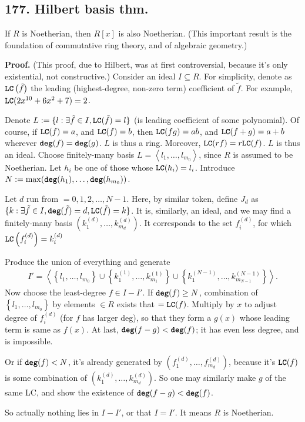 \documentclass[12pt]{article}
\newcommand\Ex\exists%
\newcommand{\Rb}[1]{ \left( #1 \right) }%
\newcommand{\Cb}[1]{ \left\{ #1 \right\} }%
\newcommand{\Ab}[1]{ \left\langle #1 \right\rangle } %
\newcommand{\Ss}[1]{\textsf{\bfseries{#1}}}%
\newcommand{\Tw}[1]{\texttt{\bfseries{#1}}}%
\newcommand{\EqGo}[1]{ \begin{gather*}{#1}\end{gather*} } %
\begin{document}
\subsection*{177. Hilbert basis thm.} If \(R\) is Noetherian, then \(R[x]\) is also Noetherian. 
(This important result is the foundation of commutative ring theory, and of algebraic geometry.) \par
\Ss{Proof.} (This proof, due to Hilbert, was at first controversial, because it's only existential, not constructive.) 
Consider an ideal \(I \subseteq R\). 
For simplicity, denote as \(\Tw{LC}\Rb{\tilde{f}}\) the leading (highest-degree, non-zero term) coefficient of \(\tilde{f}\). 
For example, \(\Tw{LC}(2x^{10}+6x^2+7) =2\). \par
Denote \(L:= \{l: \Ex \tilde{f} \in I, \Tw{LC}(\tilde{f})= l\}\) (is leading coefficient of some polynomial). 
Of course, if \(\Tw{LC}(f)=a\), and \(\Tw{LC}(f)=b\), then \(\Tw{LC}(fg)=ab\), and \(\Tw{LC}(f+g)=a+b\) wherever \(\Tw{deg}(f) = \Tw{deg}(g)\). 
\(L\) is thus a ring. 
Moreover, \(\Tw{LC}(rf) = r \Tw{LC}(f)\). 
\(L\) is thus an ideal. 
Choose finitely-many basis \(L= \Ab{l_1,\dotsc,l_{m_0}}\), since \(R\) is assumed to be Noetherian. 
Let \(h_i\) be one of those whose \(\Tw{LC}(h_i) = l_i\). 
Introduce \(N := \max(\Tw{deg}(h_1),\dotsc,\Tw{deg}(h_{m_0}))\). \par
Let \(d\) run from \(=0,1,2,\dotsc,N-1\). 
Here, by similar token, define \(J_d\) as \(\{k: \Ex \tilde{f} \in I, \Tw{deg}(\tilde{f}) =d, \Tw{LC}(\tilde{f})= k\}\). 
It is, similarly, an ideal, and we may find a finitely-many basis \(\Rb{k_1^{(d)},\dotsc,k_{m_d}^{(d)}}\). 
It corresponds to the set \(f_i^{(d)}\), for which \(\Tw{LC}\Rb{f_i^{(d)}} = k_i^{(d)}\) \par
Produce the union of everything and generate \EqGo{
 I'= \Ab{
   \Cb{l_1,\dotsc,l_{m_0}} \cup
   \Cb{k_1^{(1)},\dotsc,k_{m_1}^{(1)}} \cup 
   \Cb{k_1^{(N-1)},\dotsc,k_{m_{N-1}}^{(N-1)}}
 }.
} Now choose the least-degree \(f \in I-I'\). 
If \(\Tw{deg}(f) \geq N\), combination of \(\Cb{l_1,\dotsc,l_{m_0}}\) by elements \(\in R\) exists that \(=\Tw{LC}(f)\). 
Multiply by \(x\) to adjust degree of \(f_i^{(d)}\) (for \(f\) has larger deg), so that they form a \(g(x)\) whose leading term is same as \(f(x)\). 
At last, \(\Tw{deg}(f-g) < \Tw{deg}(f)\); it has even less degree, and is impossible. \par
Or if \(\Tw{deg}(f) <N\), it's already generated by \(\Rb{f_1^{(d)},\dotsc,f_{m_d}^{(d)}}\), because it's \(\Tw{LC}(f)\) is some combination of \(\Rb{k_1^{(d)},\dotsc,k_{m_d}^{(d)}}\). 
So one may similarly make \(g\) of the same LC, and show the existence of \(\Tw{deg}(f-g) < \Tw{deg}(f)\). \par
So actually nothing lies in \(I-I'\), or that \(I =I'\). It means \(R\) is Noetherian. 
\end{document}
